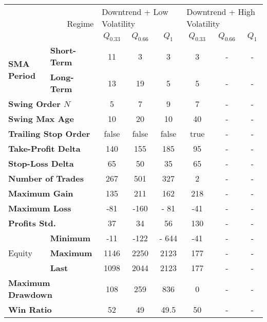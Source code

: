 \centering
\begin{tabular}{ll|cccccc}
    \toprule
    \multicolumn{2}{r|}{\multirow{2}{*}{Regime}} & \multicolumn{3}{l}{Downtrend + Low Volatility}   & \multicolumn{3}{l}{Downtrend + High Volatility}   \\
    \multicolumn{2}{r|}{} & $Q_{0.33}$ & $Q_{0.66}$ & $Q_{1}$ & $Q_{0.33}$ & $Q_{0.66}$ & $Q_{1}$ \\
    \midrule
    \multirow{2}{*}{\textbf{SMA Period}} & \textbf{Short-Term} & 11   & 3    & 3     & 3   & - & - \\
    & \textbf{Long-Term}  & 13   & 19   & 5     & 5   & - & - \\
    \multicolumn{2}{l|}{\textbf{Swing Order $N$}} & 5 & 7 & 9 & 7 & - & - \\
    \multicolumn{2}{l|}{\textbf{Swing Max Age}} & 10 & 20 & 10 & 40 & - & - \\
    \multicolumn{2}{l|}{\textbf{Trailing Stop Order}} & false & false & false & true & - & - \\
    \multicolumn{2}{l|}{\textbf{Take-Profit Delta}} & 140 & 155 & 185 & 95 & - & - \\
    \multicolumn{2}{l|}{\textbf{Stop-Loss Delta}} & 65 & 50 & 35 & 65 & - & - \\
    \midrule
    \multicolumn{2}{l|}{\textbf{Number of Trades}} & 267 & 501 & 327 & 2 & - & - \\
    \multicolumn{2}{l|}{\textbf{Maximum Gain}} & 135 & 211 & 162 & 218 & - & - \\
    \multicolumn{2}{l|}{\textbf{Maximum Loss}} & -81 & -160 & - 81 & -41 & - & - \\
    \multicolumn{2}{l|}{\textbf{Profits Std.}} & 37 & 34 & 56 & 130 & - & - \\
    \multirow{3}{*}{Equity}              & \textbf{Minimum}    & -11  & -122 & - 644 & -41 & - & - \\
    & \textbf{Maximum}    & 1146 & 2250 & 2123  & 177 & - & - \\
    & \textbf{Last}       & 1098 & 2044 & 2123  & 177 & - & - \\
    \multicolumn{2}{l|}{\textbf{Maximum Drawdown}} & 108 & 259 & 836 & 0 & - & - \\
    \multicolumn{2}{l|}{\textbf{Win Ratio}} & 52 & 49 & 49.5 & 50 & - & - \\
    \bottomrule
\end{tabular}